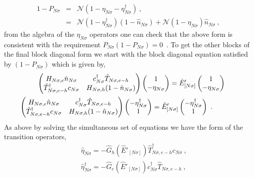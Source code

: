 \documentclass[12pt,a4paper]{article}
\begin{document}
\begin{eqnarray}
1-P_{N\sigma} &=& \mathcal{N}(1-\eta_{N\sigma}-\eta^{\dagger}_{N\sigma})~,~\nonumber\\
&=&\mathcal{N}(1-\eta^{\dagger}_{N\sigma})(1-\hat{n}_{N\sigma}) + \mathcal{N}(1-\eta_{N\sigma})\hat{n}_{N\sigma} ~,~\nonumber
\end{eqnarray}
from the algebra of the $\eta_{N\sigma}$ operators one can check that the above form is consistent with the requirement $P_{N\sigma}(1-P_{N\sigma})=0$~. 
To get the other blocks of the final block diagonal form we start with the block diagonal equation satisfied by $(1-P_{N\sigma})$ which is given by, 
\begin{eqnarray}
&&\hspace*{-1cm}
\begin{pmatrix}
H_{N\sigma,e}\hat{n}_{N\sigma} & c^{\dagger}_{N\sigma}\hat{T}_{N\sigma,e-h} \\
\hat{T}^{\dagger}_{N\sigma,e-h}c_{N\sigma} & H_{N\sigma,h}(1-\hat{n}_{N\sigma})
\end{pmatrix}\begin{pmatrix}
1 \\ -\eta_{N\sigma}
\end{pmatrix} = \hat{E}'_{[N\sigma]} \begin{pmatrix}
1 \\ -\eta_{N\sigma}
\end{pmatrix}\nonumber\\
&&\hspace*{-1cm}\begin{pmatrix}
H_{N\sigma,e}\hat{n}_{N\sigma} & c^{\dagger}_{N\sigma}\hat{T}_{N\sigma,e-h} \\
\hat{T}^{\dagger}_{N\sigma,e-h}c_{N\sigma} & H_{N\sigma,h}(1-\hat{n}_{N\sigma})
\end{pmatrix}\begin{pmatrix}
-\eta^{\dagger}_{N\sigma} \\ 1 
\end{pmatrix} =\hat{E}'_{[N\sigma]} \begin{pmatrix}
-\eta^{\dagger}_{N\sigma} \\ 1 
\end{pmatrix}~.~\hspace*{0.5cm}\label{matrix_eqn2}
\end{eqnarray}
As above by solving the simultaneous set of equations we have the form of the transition operators,
\begin{eqnarray}
&&\hat{\eta}_{N\sigma} = -\hat{G}_{h}(\hat{E}'_{[N\sigma]})\hat{T}^{\dagger}_{N\sigma,e-h}c_{N\sigma}~,~\nonumber\\
&&\hat{\eta}^{\dagger}_{N\sigma}= -\hat{G}_{e}(\hat{E}'_{[N\sigma]})c^{\dagger}_{N\sigma}\hat{T}_{N\sigma,e-h}~,~\nonumber
\end{eqnarray}
\end{document}
